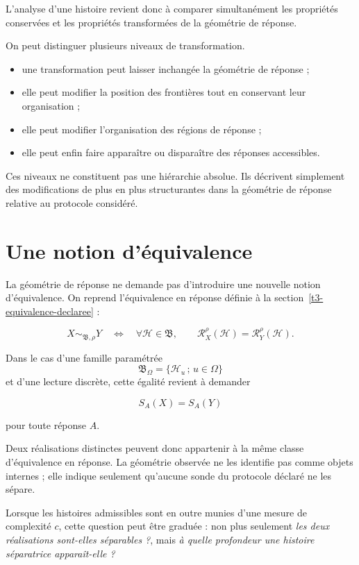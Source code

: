 L'analyse d'une histoire revient donc à comparer simultanément les propriétés conservées et les propriétés transformées de la géométrie de réponse.

On peut distinguer plusieurs niveaux de transformation.

\begin{itemize}
\tightlist
\item
une transformation peut laisser inchangée la géométrie de réponse ;

\item
elle peut modifier la position des frontières tout en conservant leur
organisation ;

\item
elle peut modifier l'organisation des régions de réponse ;

\item
elle peut enfin faire apparaître ou disparaître des réponses
accessibles.
\end{itemize}

Ces niveaux ne constituent pas une hiérarchie absolue. Ils décrivent simplement des modifications de plus en plus structurantes dans la géométrie de réponse relative au protocole considéré.

\section{Une notion d'équivalence}
\label{t3-notion-equivalence}

La géométrie de réponse ne demande pas d'introduire une nouvelle notion d'équivalence. On reprend l'équivalence en réponse définie à la section~\ref{t3-equivalence-declaree} :

\[
X\sim_{\mathfrak B,\rho}Y
\quad\Longleftrightarrow\quad
\forall\mathcal H\in\mathfrak B,
\qquad
\mathcal R_X^\rho(\mathcal H)
=
\mathcal R_Y^\rho(\mathcal H).
\]

Dans le cas d'une famille paramétrée
\[
\mathfrak B_\Omega
=
\{\mathcal H_u\,;\,u\in\Omega\}
\]
et d'une lecture discrète, cette égalité revient à demander

\[
S_A(X)=S_A(Y)
\]

pour toute réponse \(A\).

Deux réalisations distinctes peuvent donc appartenir à la même classe d'équivalence en réponse. La géométrie observée ne les identifie pas comme objets internes ; elle indique seulement qu'aucune sonde du protocole déclaré ne les sépare.

Lorsque les histoires admissibles sont en outre munies d'une mesure de complexité \(c\), cette question peut être graduée : non plus seulement \emph{les deux réalisations sont-elles séparables ?}, mais \emph{à quelle profondeur une histoire séparatrice apparaît-elle ?}

